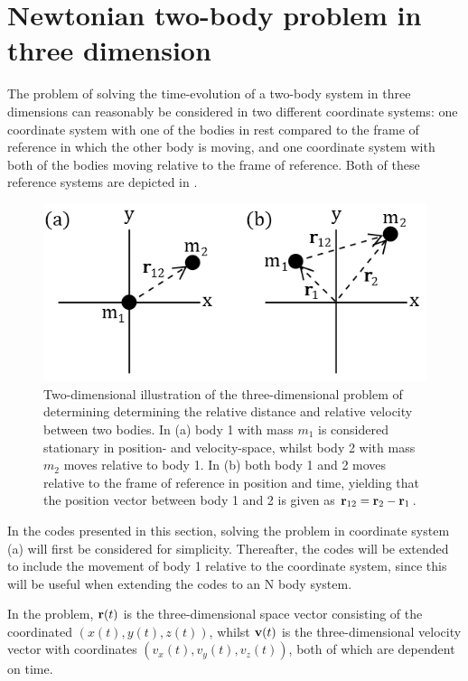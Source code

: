 \section{Newtonian two-body problem in three dimension}
\label{Newton2body3D}
The problem of solving the time-evolution of a two-body system in three dimensions can reasonably be considered in two different coordinate systems: one coordinate system with one of the bodies in rest compared to the frame of reference in which the other body is moving, and one coordinate system with both of the bodies moving relative to the frame of reference. 
Both of these reference systems are depicted in . 
\begin{figure}[H]
\centering
	\includegraphics[width=0.6\linewidth]{Figures/2bodyproblem_coordinatesystems.png}
\caption{
Two-dimensional illustration of the three-dimensional problem of determining determining the relative distance and relative velocity between two bodies. 
In (a) body 1 with mass $m_1$ is considered stationary in position- and velocity-space, whilst body 2 with mass $m_2$ moves relative to body 1.
In (b) both body 1 and 2 moves relative to the frame of reference in position and time, yielding that the position vector between body 1 and 2 is given as $\mbox{\textbf{r}}_{12} = \mbox{\textbf{r}}_2 - \mbox{\textbf{r}}_1$.
}
\label{fig:2bodyproblem_coordinatesystems}
\end{figure}
In the codes presented in this section, solving the problem in coordinate system (a) will first be considered for simplicity. Thereafter, the codes will be extended to include the movement of body 1 relative to the coordinate system, since this will be useful when extending the codes to an N body system.  

In the problem, $\mbox{\textbf{r}}(t)$ is the three-dimensional space vector consisting of the coordinated $(x(t),y(t),z(t))$, whilst $\mbox{\textbf{v}}(t)$ is the three-dimensional velocity vector with coordinates $(v_x(t),v_y(t),v_z(t))$, both of which are dependent on time. 

